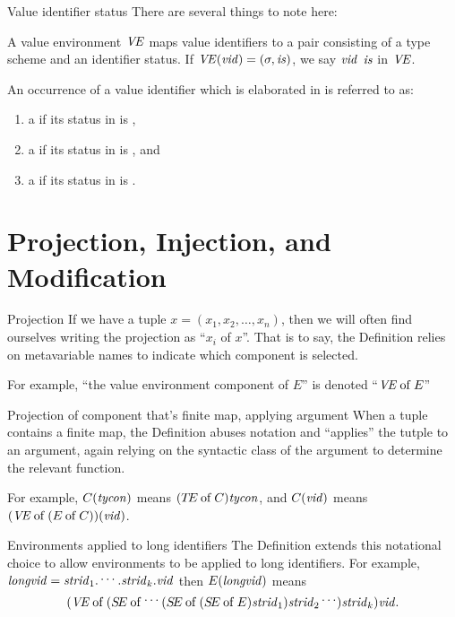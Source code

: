 \begin{definition}{Value identifier status}
There are several things to note here:

A value environment $\textit{V\kern-.05emE\/}$ maps value identifiers to a pair
consisting of a type scheme and an identifier status.
If $\textit{V\kern-.05emE\/}(\textit{vid\/})=(\sigma,\textit{is\/})$, we say $\textit{vid\/}$ 
$\textit{is\/}$ in $\textit{V\kern-.05emE\/}$.

An occurrence of a value identifier which is elaborated in \VE{} is
referred to as:
\begin{enumerate}
\item a  if its status in \VE{} is \isv,
\item a  if its status in \VE{} is \isc, and
\item a  if its status in \VE{} is \ise.
\end{enumerate}
\end{definition}

\section{Projection, Injection, and Modification}

\begin{definition}{Projection}
If we have a tuple $x=(x_{1},x_{2},\dots,x_{n})$, then we will often
find ourselves writing the projection as ``$x_{i}$ of $x$''. That is to
say, the Definition relies on metavariable names to indicate which
component is selected.

For example, ``the value environment component of $E$'' is denoted
``$\textit{V\kern-.05emE\/} \mathbin{\rm of} E$''
\end{definition}

\begin{convention}{Projection of component that's finite map, applying argument}
When a tuple contains a finite map, the Definition abuses notation and
``applies'' the tutple to an argument, again relying on the syntactic
class of the argument to determine the relevant function.

For example, $C(\textit{tycon\/})$ means $(\mbox{$T\!E$} \mathbin{\rm of} C)\textit{tycon\/}$,
and $C(\textit{vid\/})$ means $(\textit{V\kern-.05emE\/} \mathbin{\rm of} (E \mathbin{\rm of} C))(\textit{vid\/})$.
\end{convention}

\begin{convention}{Environments applied to long identifiers}
The Definition extends this notational choice to allow environments to
be applied to long identifiers. For example,$\textit{longvid\/} = \textit{strid\/}_1.\mathinner{{}^{\textstyle .\,.\,.}}.\textit{strid\/}_k.\textit{vid\/}$ then
$E(\textit{longvid\/})$ means
\begin{equation*}
   (\textit{V\kern-.05emE\/} \mathbin{\rm of} (\mbox{$S\!E$} \mathbin{\rm of} \mathinner{{}^{\textstyle .\,.\,.}}(\mbox{$S\!E$} \mathbin{\rm of} (\mbox{$S\!E$} \mathbin{\rm of} E)\textit{strid\/}_1
                   )\textit{strid\/}_2\mathinner{{}^{\textstyle .\,.\,.}}
        )\textit{strid\/}_k
    )\textit{vid\/}.
\end{equation*}
\end{convention}


